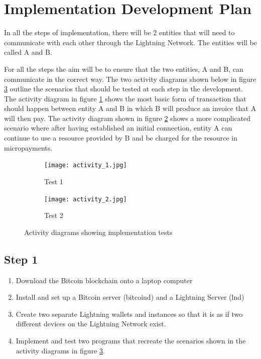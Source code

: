 \section{Implementation Development Plan}

In all the steps of implementation, there will be 2 entities that will need to communicate with each other through the Lightning Network. The entities will be called A and B.

For all the steps the aim will be to ensure that the two entities, A and B, can communicate in the correct way. The two activity diagrams shown below in figure \ref{fig:activity_diagrams} outline the scenarios that should be tested at each step in the development. The activity diagram in figure \ref{fig:test_1} shows the most basic form of transaction that should happen between entity A and B in which B will produce an invoice that A will then pay. The activity diagram shown in figure \ref{fig:test_2} shows a more complicated scenario where after having established an initial connection, entity A can continue to use a resource provided by B and be charged for the resource in micropayments.

\begin{figure}[h!]
     \centering
     \begin{subfigure}[b]{0.2\textwidth}
         \centering
         \texttt{[image: activity\_1.jpg]}
         \caption{Test 1}
         \label{fig:test_1}
     \end{subfigure}
     \hfill
     \begin{subfigure}[b]{0.4\textwidth}
         \centering
         \texttt{[image: activity\_2.jpg]}
         \caption{Test 2}
         \label{fig:test_2}
     \end{subfigure}
     \caption{Activity diagrams showing implementation tests}
      \label{fig:activity_diagrams}
\end{figure}

\subsection{Step 1}

\begin{enumerate}[label=\alph*)]
    \item Download the Bitcoin blockchain onto a laptop computer
    \item Install and set up a Bitcoin server (bitcoind) and a Lightning Server (lnd)
    \item Create two separate Lightning wallets and instances so that it is as if two different devices on the Lightning Network exist.
    \item  Implement and test two programs that recreate the scenarios shown in the activity diagrams in figure \ref{fig:activity_diagrams}.
\end{enumerate}

